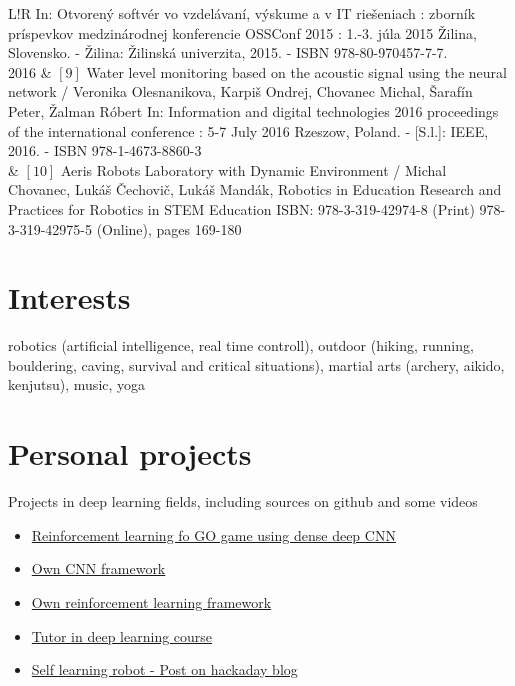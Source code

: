 \documentclass[10pt]{article}
\newcommand\VRule{\color{lightgray}\vrule width 0.5pt}
\begin{document}
\begin{tabular}{L!{\VRule}R}
In: Otvorený softvér vo vzdelávaní, výskume a v IT riešeniach : zborník príspevkov medzinárodnej konferencie OSSConf 2015 : 1.-3. júla 2015 Žilina, Slovensko. - Žilina: Žilinská univerzita, 2015. - ISBN 978-80-970457-7-7. \\[5pt]
2016 & $[9]$ Water level monitoring based on the acoustic signal using the neural network / Veronika Olesnanikova, Karpiš Ondrej, Chovanec Michal, Šarafín Peter, Žalman Róbert
In: Information and digital technologies 2016 proceedings of the international conference : 5-7 July 2016 Rzeszow, Poland. - [S.l.]: IEEE, 2016. - ISBN 978-1-4673-8860-3  \\[5pt]
& $[10]$ Aeris Robots Laboratory with Dynamic Environment / Michal Chovanec, Lukáš Čechovič, Lukáš Mandák, Robotics in Education Research and Practices for Robotics in STEM Education ISBN: 978-3-319-42974-8 (Print) 978-3-319-42975-5 (Online), pages 169-180  \\[5pt]


\end{tabular}

\section*{Interests}
robotics (artificial intelligence, real time controll),
outdoor (hiking, running, bouldering, caving, survival and critical situations),
martial arts (archery, aikido, kenjutsu), music, yoga

\section*{Personal projects}

Projects in deep learning fields, including sources on github and some videos

\begin{itemize}
\item \href{https://github.com/michalnand/go}{Reinforcement learning fo GO game using dense deep CNN}
\item \href{https://github.com/michalnand/rysy}{Own CNN framework}
\item \href{https://github.com/michalnand/reinforcement_learning}{Own reinforcement learning framework}
\item \href{https://github.com/michalnand/deep_learning_course}{Tutor in deep learning course}
\item \href{https://hackaday.io/project/19924-self-learning-robot}{Self learning robot - Post on hackaday blog}
\end{itemize}
\end{document}
